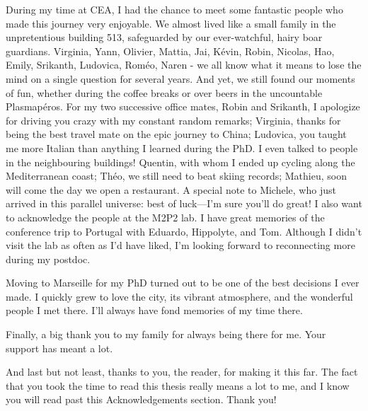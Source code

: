 During my time at CEA, I had the chance to meet some fantastic people who made this journey very enjoyable. We almost lived like a small family in the unpretentious building 513, safeguarded by our ever-watchful, hairy boar guardians. Virginia, Yann, Olivier, Mattia, Jai, Kévin, Robin, Nicolas, Hao, Emily, Srikanth, Ludovica, Roméo, Naren - we all know what it means to lose the mind on a single question for several years. And yet, we still found our moments of fun, whether during the coffee breaks or over beers in the uncountable Plasmapéros. For my two successive office mates, Robin and Srikanth, I apologize for driving you crazy with my constant random remarks; Virginia, thanks for being the best travel mate on the epic journey to China; Ludovica, you taught me more Italian than anything I learned during the PhD. I even talked to people in the neighbouring buildings! Quentin, with whom I ended up cycling along the Mediterranean coast; Théo, we still need to beat skiing records; Mathieu, soon will come the day we open a restaurant. A special note to Michele, who just arrived in this parallel universe: best of luck—I’m sure you’ll do great! I also want to acknowledge the people at the M2P2 lab. I have great memories of the conference trip to Portugal with Eduardo, Hippolyte, and Tom. Although I didn’t visit the lab as often as I’d have liked, I’m looking forward to reconnecting more during my postdoc.

Moving to Marseille for my PhD turned out to be one of the best decisions I ever made. I quickly grew to love the city, its vibrant atmosphere, and the wonderful people I met there. I’ll always have fond memories of my time there.

Finally, a big thank you to my family for always being there for me. Your support has meant a lot.

And last but not least, thanks to you, the reader, for making it this far. The fact that you took the time to read this thesis really means a lot to me, and I know you will read past this Acknowledgements section. Thank you!